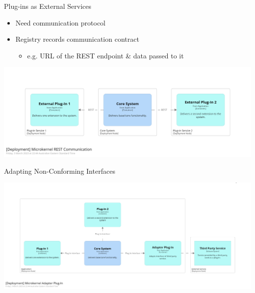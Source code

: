 \documentclass{slide}
\begin{document}
\begin{frame}{Plug-ins as External Services}
    \begin{itemize}
        \LARGE\item Need communication protocol
        \vspace{2mm}
        \LARGE\item Registry records communication contract
        \begin{itemize}
            \Large\item e.g. URL of the REST endpoint \& data passed to it
        \end{itemize}
    \end{itemize}
    \vspace{8mm}
    \includegraphics[trim=197 197 197 195,clip,width=\textwidth]{../../notes/microkernel/diagrams/rest-microkernel.png}
\end{frame}

\begin{frame}{Adapting Non-Conforming Interfaces}
    \begin{adjustwidth}{-7.5mm}{-7.5mm}
        \includegraphics[trim=195 197 195 195,clip,width=0.97\paperwidth]{../../notes/microkernel/diagrams/adapter-plug-in.png}
    \end{adjustwidth}
\end{frame}
\end{document}
